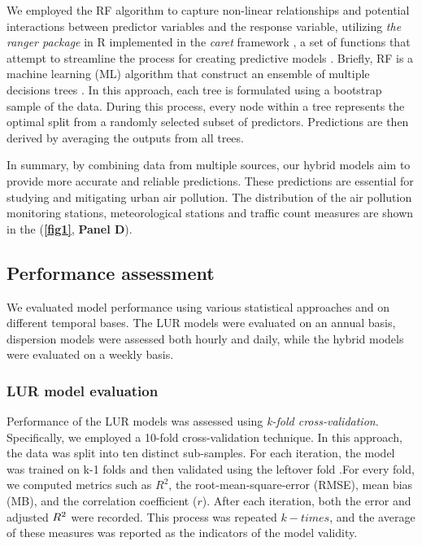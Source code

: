 \documentclass{article}
\begin{document}
We employed the RF algorithm to capture non-linear relationships and potential interactions between predictor variables and the response variable, utilizing \textit{the ranger package} in R implemented in the \textit{caret} framework \cite{wright2019}, a set of functions that attempt to streamline the process for creating predictive models \cite{caret2008}. Briefly, RF is a machine learning (ML) algorithm that construct an ensemble of multiple decisions trees \cite{breiman2001}. In this approach, each tree is formulated using a bootstrap sample of the data. During this process, every node within a tree represents the optimal split from a randomly selected subset of predictors. Predictions are then derived by averaging the outputs from all trees.

In summary, by combining data from multiple sources, our hybrid models aim to provide more accurate and reliable predictions. These predictions are essential for studying and mitigating urban air pollution. The distribution of the air pollution monitoring stations, meteorological stations and traffic count measures are shown in the (\textbf{\cref{fig1}}, \textbf{Panel D}). 

\subsection{Performance assessment}

We evaluated model performance using various statistical approaches and on different temporal bases. The LUR models were evaluated on an annual basis, dispersion models were assessed both hourly and daily, while the hybrid models were evaluated on a weekly basis.

\subsubsection{LUR model evaluation}
Performance of the LUR models was assessed using \textit{k-fold cross-validation}. Specifically, we employed a 10-fold cross-validation technique. In this approach, the data was split into ten distinct sub-samples. For each iteration, the model was trained on k-1 folds and then validated using the leftover fold \cite{ziegel2003}.For every fold, we computed metrics such as \(R^2\), the root-mean-square-error (RMSE), mean bias (MB), and the correlation coefficient (\(r\)). After each iteration, both the error and adjusted \(R\textsuperscript{2}\) were recorded. This process was repeated \(k-times\), and the average of these measures was reported as the indicators of the model validity. 
\vspace{0.5cm}
\end{document}
